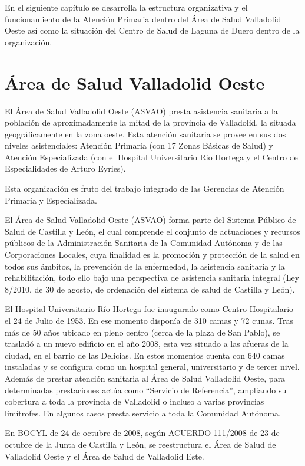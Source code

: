 En el siguiente capítulo se desarrolla la estructura organizativa y el funcionamiento de la Atención Primaria dentro del Área de Salud Valladolid Oeste así como la situación del Centro de Salud de Laguna de Duero dentro de la organización.

\section{Área de Salud Valladolid Oeste}

El Área de Salud Valladolid Oeste (ASVAO) presta asistencia sanitaria a la población de aproximadamente la mitad de la provincia de Valladolid, la situada geográficamente en la zona oeste. Esta atención sanitaria se provee en sus dos niveles asistenciales: Atención Primaria (con 17 Zonas Básicas de Salud) y Atención Especializada (con el Hospital Universitario Rio Hortega y el Centro de Especialidades de Arturo Eyries).

Esta organización es fruto del trabajo integrado de las Gerencias de Atención Primaria y Especializada.

El Área de Salud Valladolid Oeste (ASVAO) forma parte del Sistema Público de Salud de Castilla y León, el cual comprende el conjunto de actuaciones y recursos públicos de la Administración Sanitaria de la Comunidad Autónoma y de las Corporaciones Locales, cuya finalidad es la promoción y protección de la salud en todos sus ámbitos, la prevención de la enfermedad, la asistencia sanitaria y la rehabilitación, todo ello bajo una perspectiva de asistencia sanitaria integral (Ley 8/2010, de 30 de agosto, de ordenación del sistema de salud de Castilla y León).

El Hospital Universitario Río Hortega fue inaugurado como Centro Hospitalario el 24 de Julio de 1953. En ese momento disponía de 310 camas y 72 cunas. Tras más de 50 años ubicado en pleno centro (cerca de la plaza de San Pablo), se trasladó a un nuevo edificio en el año 2008, esta vez situado a las afueras de la ciudad, en el barrio de las Delicias. En estos momentos cuenta con 640 camas instaladas y se configura como un hospital general, universitario y de tercer nivel. Además de prestar atención sanitaria al Área de Salud Valladolid Oeste, para determinadas prestaciones actúa como “Servicio de Referencia”, ampliando su cobertura a toda la provincia de Valladolid o incluso a varias provincias limítrofes. En algunos casos presta servicio a toda la Comunidad Autónoma.

En BOCYL de 24 de octubre de 2008, según ACUERDO 111/2008 de 23 de octubre de la Junta de Castilla y León, se reestructura el Área de Salud de Valladolid Oeste y el Área de Salud de Valladolid Este.


